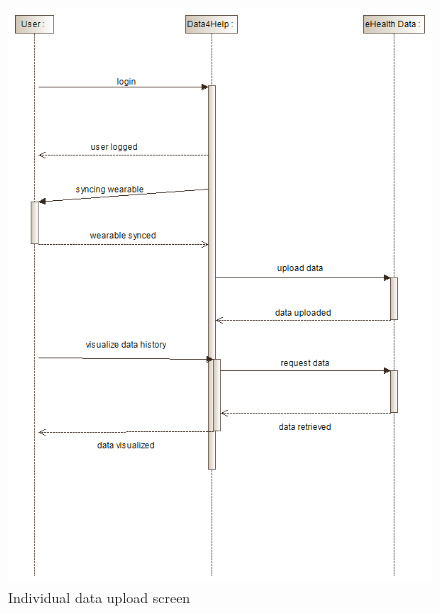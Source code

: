 \begin{figure}[H]
  \includegraphics[width=0.79\linewidth]{resources/UML/IndividualInteraction.png}
  \caption{Individual data upload screen}
  \label{fig:Individual sequence diagram}
\end{figure}

